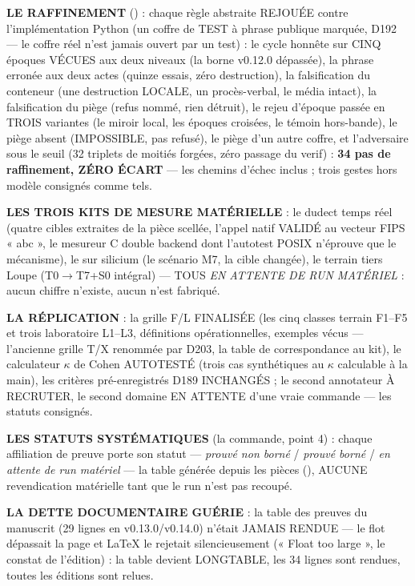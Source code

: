 \textbf{LE RAFFINEMENT} () : chaque règle abstraite REJOUÉE contre
l'implémentation Python (un coffre de TEST à phrase publique marquée,
D192 — le coffre réel n'est jamais ouvert par un test) : le cycle
honnête sur CINQ époques VÉCUES aux deux niveaux (la borne v0.12.0
dépassée), la phrase erronée aux deux actes (quinze essais, zéro
destruction), la falsification du conteneur (une destruction LOCALE,
un procès-verbal, le média intact), la falsification du piège (refus
nommé, rien détruit), le rejeu d'époque passée en TROIS variantes (le
miroir local, les époques croisées, le témoin hors-bande), le piège
absent (IMPOSSIBLE, pas refusé), le piège d'un autre coffre, et
l'adversaire sous le seuil (32 triplets de moitiés forgées, zéro
passage du verif) : \textbf{34 pas de raffinement, ZÉRO ÉCART} — les
chemins d'échec inclus ; trois gestes hors modèle consignés comme
tels.

\textbf{LES TROIS KITS DE MESURE MATÉRIELLE} : le dudect temps réel
(quatre cibles extraites de la pièce scellée, l'appel natif VALIDÉ au
vecteur FIPS « abc », le mesureur C double backend dont l'autotest
POSIX n'éprouve que le mécanisme), le  sur silicium (le
scénario M7, la cible changée), le terrain tiers Loupe (T0$\to$T7+S0
intégral) — TOUS \emph{EN ATTENTE DE RUN MATÉRIEL} : aucun chiffre
n'existe, aucun n'est fabriqué.

\textbf{LA RÉPLICATION} : la grille F/L FINALISÉE (les cinq classes
terrain F1--F5 et trois laboratoire L1--L3, définitions
opérationnelles, exemples vécus — l'ancienne grille T/X renommée par
D203, la table de correspondance au kit), le calculateur $\kappa$ de Cohen AUTOTESTÉ (trois cas
synthétiques au $\kappa$ calculable à la main), les critères
pré-enregistrés D189 INCHANGÉS ; le second annotateur À RECRUTER, le
second domaine EN ATTENTE d'une vraie commande — les statuts consignés.

\textbf{LES STATUTS SYSTÉMATIQUES} (la commande, point 4) : chaque
affiliation de preuve porte son statut — \emph{prouvé non borné} /
\emph{prouvé borné} / \emph{en attente de run matériel} — la table
générée depuis les pièces (),
AUCUNE revendication matérielle tant que le run n'est pas recoupé.

\textbf{LA DETTE DOCUMENTAIRE GUÉRIE} : la table des preuves du
manuscrit (29 lignes en v0.13.0/v0.14.0) n'était JAMAIS RENDUE — le
flot dépassait la page et \LaTeX{} le rejetait silencieusement (« Float
too large », le constat de l'édition) : la table devient LONGTABLE,
les 34 lignes sont rendues, toutes les éditions sont relues.

